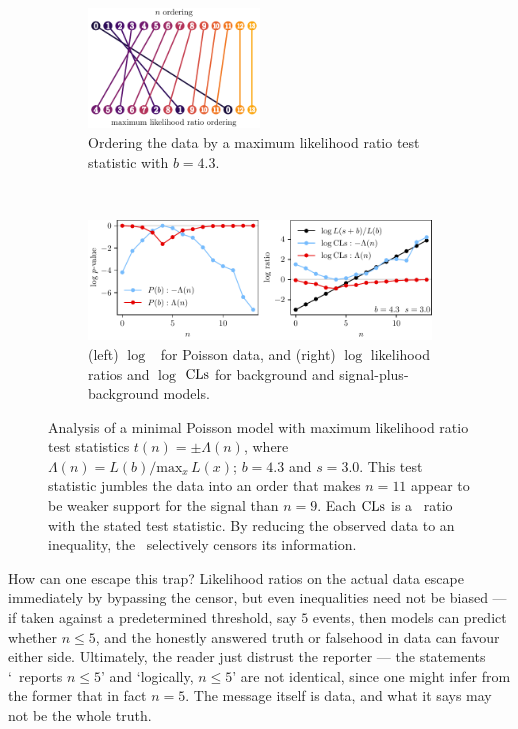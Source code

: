 \begin{figure}[tp]
\centering
\begin{subfigure}{\textwidth}
\centering
\includegraphics[width=0.5\textwidth]{figures/searches_cls_plots_with_pvals_order.pdf}
\caption{%
Ordering the data by a maximum likelihood ratio test statistic with $b=4.3$.
}
\end{subfigure}
\\[.5em]
\begin{subfigure}{\textwidth}
\centering
\includegraphics[width=\textwidth]{figures/searches_cls_plots_with_pvals_t.pdf}
\caption{%
(left) $\log$ \pvalues\ for Poisson data,
and (right) $\log$ likelihood ratios and $\log$ $\mathrm{CLs}$ for
background and signal-plus-background models.%
}
\end{subfigure}
\caption[
Analysis of a minimal Poisson model with maximum likelihood ratio
test statistics
]{%
Analysis of a minimal Poisson model with maximum likelihood ratio
test statistics $t(n) = \pm \Lambda(n)$,
where $\Lambda(n) = L(b)/\mathrm{max}_x\,L(x)$; $b = 4.3$ and $s = 3.0$.
This test statistic jumbles the data into an order that makes $n=11$ appear to
be weaker support for the signal than $n=9$.
Each $\mathrm{CLs}$ is a \pvalue\ ratio with the stated test statistic.
By reducing the observed data to an inequality, the \pvalue\ selectively
censors its information.
}
\label{fig:searches_sb_t}
\end{figure}

How can one escape this trap?
Likelihood ratios on the actual data escape immediately by bypassing the
censor, but even inequalities need not be biased --- if taken against a
predetermined threshold, say $5$ events, then models can predict whether
$n \leq 5$, and the honestly answered truth or falsehood in data can favour
either side.
Ultimately, the reader just distrust the reporter ---
the statements `\atlas\ reports $n \leq 5$' and `logically, $n \leq 5$' are not
identical, since one might infer from the former that in fact $n = 5$.
The message itself is data, and what it says may not be the whole truth.

